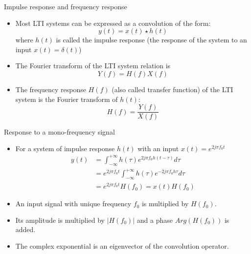 \begin{block}{Impulse response and frequency response}
    \begin{itemize}
      \item Most LTI systems can be expressed as a convolution of the form:
     $$y(t)=x(t)\star h(t)$$
     where $h(t)$ is called the impulse response (the response of the system to an input $x(t)=\delta(t)$)
     \item The Fourier transform of the LTI system relation is
     \begin{equation}
      \label{eq:rep_freq_syst}
      Y(f)=H(f)X(f)
    \end{equation}
    \item The frequency response $H(f)$ (also called transfer function) of the LTI system is the Fourier transform of $h(t)$:
    \begin{equation}
      \label{eq:rep_freq_syst2}
      H(f)=\frac{Y(f)}{X(f)}
    \end{equation}
    \end{itemize}

  \end{block}


  \begin{block}{Response to a mono-frequency signal}
    \begin{itemize}
    \item For a system of impulse response $h(t)$ with an input $x(t)=e^{2j\pi f_0 t}$
\begin{align*}
  y(t) &= \int_{-\infty}^{+\infty}h(\tau)e^{2j\pi f_0 h(t-\tau)}d\tau\\
&= e^{2j\pi f_0 t} \int_{-\infty}^{+\infty}h(\tau)e^{- 2 j\pi f_0
  h\tau}d\tau\\
&=e^{2j\pi f_0 t} H(f_0)=x(t)H(f_0)
\end{align*}
\item An input signal with unique frequency $f_0$ is multiplied by $H(f_0)$.
\item Its amplitude is multiplied by $|H(f_0)|$ and a phase $Arg(H(f_0))$ is added.
\item The complex exponential is an eigenvector of the convolution operator.
    \end{itemize}

  \end{block}

